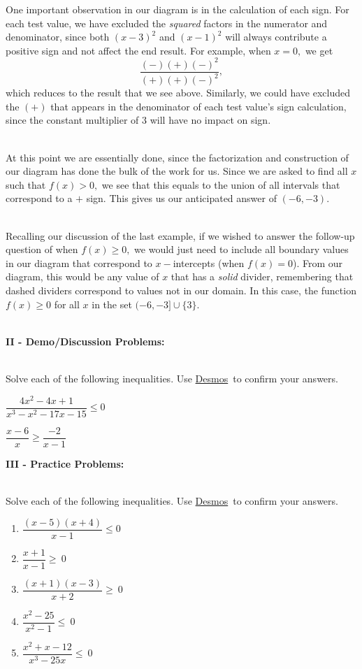 \documentclass[12pt]{article}
\theoremstyle{definition}
\newcommand{\Desmos}{\href{https://www.desmos.com/}{Desmos}}
\begin{document}
One important observation in our diagram is in the calculation of each sign.  For each test value, we have excluded the {\it squared} factors in the numerator and denominator, since both $(x-3)^2$ and $(x-1)^2$ will always contribute a positive sign and not affect the end result.  For example, when $x=0,$ we get $$\dfrac{(-)(+)(-)^2}{(+)(+)(-)^2},$$ which reduces to the result that we see above.  Similarly, we could have excluded the $(+)$ that appears in the denominator of each test value's sign calculation, since the constant multiplier of $3$ will have no impact on sign.\\
\ \par
At this point we are essentially done, since the factorization and construction of our diagram has done the bulk of the work for us.  Since we are asked to find all $x$ such that $f(x)>0,$ we see that this equals to the union of all intervals that correspond to a $+$ sign.  This gives us our anticipated answer of $(-6,-3)$.\\
\ \par
Recalling our discussion of the last example, if we wished to answer the follow-up question of when $f(x)\geq 0,$ we would just need to include all boundary values in our diagram that correspond to $x-$intercepts (when $f(x)=0$).  From our diagram, this would be any value of $x$ that has a {\it solid} divider, remembering that dashed dividers correspond to values not in our domain.  In this case, the function $f(x)\geq 0$ for all $x$ in the set $(-6,-3]\cup\{3\}$.\\
\ \par
{\bf II - Demo/Discussion Problems:}\\
\ \par
Solve each of the following inequalities.  Use \Desmos \ to confirm your answers. 
\begin{enumerate}
\begin{multicols}{2}
\item $\dfrac{4x^2-4x+1}{x^3-x^2-17x-15}\leq 0$
\item $\dfrac{x-6}{x}\geq\dfrac{-2}{x-1}$
\end{multicols}
\end{enumerate}
\newpage
{\bf III - Practice Problems:}\\
\ \par
Solve each of the following inequalities.  Use \Desmos \ to confirm your answers.
\begin{enumerate}
\item $\dfrac{(x-5)(x+4)}{x-1}\leq 0$
\item $\dfrac{x+1}{x-1}\geq\ 0$
\item $\dfrac{(x+1)(x-3)}{x+2}\geq\ 0$
\item $\dfrac{x^2-25}{x^2-1}\leq\ 0$ 
\item $\dfrac{x^2+x-12}{x^3-25x}\leq\ 0$
\end{enumerate}
\newpage
\ \newpage
\end{document}
